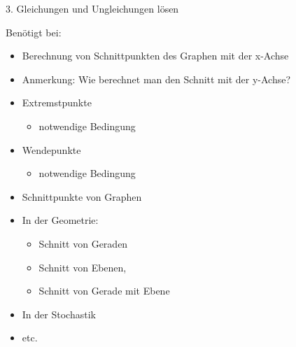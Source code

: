 \documentclass[
  ignorenonframetext,
  aspectratio=169,
]{beamer}
\author{}
\date{2024-02-14}
\providecommand{\tightlist}{%
  \setlength{\itemsep}{0pt}\setlength{\parskip}{0pt}}\usepackage{longtable,booktabs,array}
\begin{document}
\begin{frame}{3. Gleichungen und Ungleichungen lösen}
\label{gleichungen-und-ungleichungen-luxf6sen}
\pause

Benötigt bei:

\pause

\begin{itemize}
\tightlist
\item
  Berechnung von Schnittpunkten des Graphen mit der x-Achse
\item
  Anmerkung: Wie berechnet man den Schnitt mit der y-Achse?
\item
  Extremstpunkte

  \begin{itemize}
  \tightlist
  \item
    notwendige Bedingung
  \end{itemize}
\item
  Wendepunkte

  \begin{itemize}
  \tightlist
  \item
    notwendige Bedingung
  \end{itemize}
\item
  Schnittpunkte von Graphen
\item
  In der Geometrie:

  \begin{itemize}
  \tightlist
  \item
    Schnitt von Geraden
  \item
    Schnitt von Ebenen,
  \item
    Schnitt von Gerade mit Ebene
  \end{itemize}
\item
  In der Stochastik
\item
  etc.
\end{itemize}
\end{frame}
\end{document}
